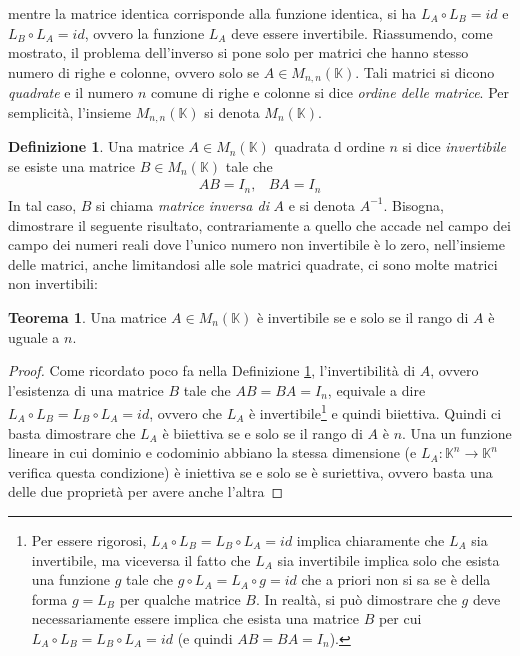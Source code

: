 \documentclass{book}
\theoremstyle{definition}
\newtheorem{defi}{Definizione}[section]
\newtheorem{teo}{Teorema}[section]
\theoremstyle{plain}
\begin{document}
mentre la matrice identica corrisponde alla funzione identica, si ha $L_A\circ L_B=id$ e $L_B\circ L_A=id$,
ovvero la funzione $L_A$ deve essere invertibile. Riassumendo, come mostrato, il problema dell'inverso si
pone solo per matrici che hanno stesso numero di righe e colonne, ovvero solo se $A\in M_{n,n}(\mathds{K})$.
Tali matrici si dicono \emph{quadrate} e il numero $n$ comune di righe e colonne si dice \textit{ordine delle
  matrice}. Per semplicità, l'insieme $M_{n,n}(\mathds{K})$ si denota $M_n(\mathds{K})$. 
\begin{defi}
  \label{defi:Compinveeproddimatrici1}
  Una matrice $A\in M_n(\mathds{K})$ quadrata d ordine $n$ si dice \textit{invertibile} se esiste una matrice
  $B\in M_n(\mathds{K})$ tale che
  \begin{eqnarray}
    \label{eq:Compinveeproddimatrici8}
    AB=I_n, & BA=I_n
  \end{eqnarray}
  In tal caso, $B$ si chiama \textit{matrice inversa di} $A$ e si denota $A^{-1}$. Bisogna, dimostrare il
  seguente risultato, contrariamente a quello che accade nel campo dei campo dei numeri reali dove l'unico
  numero non invertibile è lo zero, nell'insieme delle matrici, anche limitandosi alle sole matrici quadrate,
  ci sono molte matrici non invertibili:
\end{defi}
\begin{teo}
  \label{teo:Compinveeproddimatrici1}
  Una matrice $A\in M_n(\mathds{K})$ è invertibile se e solo se il rango di $A$ è uguale a $n$.
\end{teo}
\begin{proof}
  Come ricordato poco fa nella Definizione \ref{defi:Compinveeproddimatrici1}, l'invertibilità di $A$, ovvero
  l'esistenza di una matrice $B$ tale che $AB=BA=I_n$, equivale a dire $L_A\circ L_B=L_B\circ L_A=id$, ovvero
  che $L_A$ è invertibile\footnote{Per essere rigorosi, $L_A\circ L_B=L_B\circ L_A=id$ implica chiaramente che
    $L_A$ sia invertibile, ma viceversa il fatto che $L_A$ sia invertibile implica solo che esista una
    funzione $g$ tale che $g\circ L_A=L_A\circ g=id$ che a priori non si sa se è della forma $g=L_B$ per
    qualche matrice $B$. In realtà, si può dimostrare che $g$ deve necessariamente essere implica che esista
    una matrice $B$ per cui $L_A\circ L_B=L_B\circ L_A=id$ (e quindi $AB=BA=I_n$).} e quindi biiettiva. Quindi
  ci basta dimostrare che $L_A$ è biiettiva se e solo se il rango di $A$ è $n$. Una un funzione lineare in cui
  dominio e codominio abbiano la stessa dimensione (e $L_A:\mathds{K}^n\to \mathds{K}^n$ verifica questa
  condizione) è iniettiva se e solo se è suriettiva, ovvero basta una delle due proprietà per avere anche
  l'altra
\end{proof}
\end{document}
